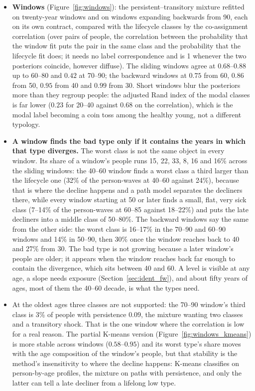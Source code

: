 \documentclass[11pt]{article}
\begin{document}
\begin{itemize}
		\item \textbf{Windows} (Figure~\ref{fig:windows}): the persistent--transitory mixture refitted on twenty-year windows and on windows expanding backwards from 90, each on its own contract, compared with the lifecycle classes by the co-assignment correlation (over pairs of people, the correlation between the probability that the window fit puts the pair in the same class and the probability that the lifecycle fit does; it needs no label correspondence and is 1 whenever the two posteriors coincide, however diffuse). The sliding windows agree at $0.68$--$0.88$ up to 60--80 and $0.42$ at 70--90; the backward windows at $0.75$ from 60, $0.86$ from 50, $0.95$ from 40 and $0.99$ from 30. Short windows blur the posteriors more than they regroup people: the adjusted Rand index of the modal classes is far lower ($0.23$ for 20--40 against $0.68$ on the correlation), which is the modal label becoming a coin toss among the healthy young, not a different typology.
		\item \textbf{A window finds the bad type only if it contains the years in which that type diverges.} The worst class is not the same object in every window. Its share of a window's people runs 15, 22, 33, 8, 16 and 16\% across the sliding windows: the 40--60 window finds a worst class a third larger than the lifecycle one (32\% of the person-waves at 40--60 against 24\%), because that is where the decline happens and a path model separates the decliners there, while every window starting at 50 or later finds a small, flat, very sick class (7--14\% of the person-waves at 60--85 against 18--22\%) and puts the late decliners into a middle class of 50--80\%. The backward windows say the same from the other side: the worst class is 16--17\% in the 70--90 and 60--90 windows and 14\% in 50--90, then 30\% once the window reaches back to 40 and 27\% from 30. The bad type is not growing because a later window's people are older; it appears when the window reaches back far enough to contain the divergence, which sits between 40 and 60. A level is visible at any age, a slope needs exposure (Section~\ref{sec:ident_fw}), and about fifty years of ages, most of them the 40--60 decade, is what the types need.
		\item At the oldest ages three classes are not supported: the 70--90 window's third class is 3\% of people with persistence $0.09$, the mixture wanting two classes and a transitory shock. That is the one window where the correlation is low for a real reason. The partial K-means version (Figure~\ref{fig:windows_kmeans}) is more stable across windows ($0.58$--$0.95$) and its worst type's share moves with the age composition of the window's people, but that stability is the method's insensitivity to where the decline happens: K-means classifies on person-by-age profiles, the mixture on paths with persistence, and only the latter can tell a late decliner from a lifelong low type.

\end{itemize}
\end{document}

